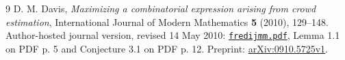 \documentclass[11pt]{article}
\begin{document}
\begin{thebibliography}{9}
D. M. Davis, \emph{Maximizing a combinatorial expression arising from
crowd estimation}, International Journal of Modern Mathematics
\textbf{5} (2010), 129--148. Author-hosted journal version, revised
14 May 2010:
\href{https://www.lehigh.edu/~dmd1/fredijmm.pdf}{\texttt{fredijmm.pdf}},
Lemma 1.1 on PDF p. 5 and Conjecture 3.1 on PDF p. 12.
Preprint: \href{https://arxiv.org/abs/0910.5725}{arXiv:0910.5725v1}.
\end{thebibliography}
\end{document}
